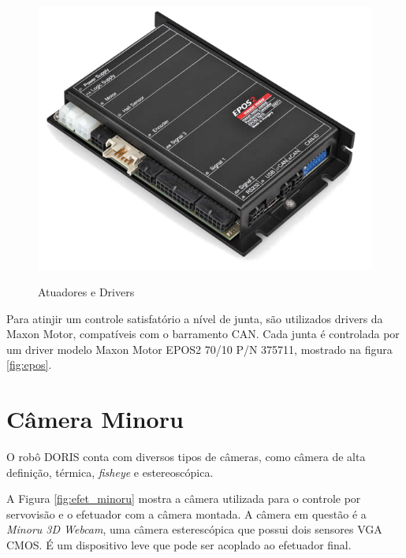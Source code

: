 \begin{figure}[htp]
{  \includegraphics[height=\twosubht]{./img/epos2-70-10.png}%
}
\caption{Atuadores e Drivers}
\end{figure}


Para atinjir um controle satisfatório a nível de junta, são utilizados drivers da Maxon Motor, compatíveis com o barramento CAN. Cada junta é controlada por um driver modelo Maxon Motor EPOS2 70/10 P/N 375711, mostrado na figura \ref{fig:epos}.

\section{Câmera Minoru} \label{sec:minoru}

O robô DORIS conta com diversos tipos de câmeras, como câmera de alta definição, térmica, \textit{fisheye} e estereoscópica. 

A Figura \ref{fig:efet_minoru} mostra a câmera utilizada para o controle por servovisão e o efetuador com a câmera montada.
A câmera em questão é a \textit{Minoru 3D Webcam}, uma câmera esterescópica que possui dois sensores VGA CMOS. É um dispositivo leve que pode ser acoplado ao efetuador final.


